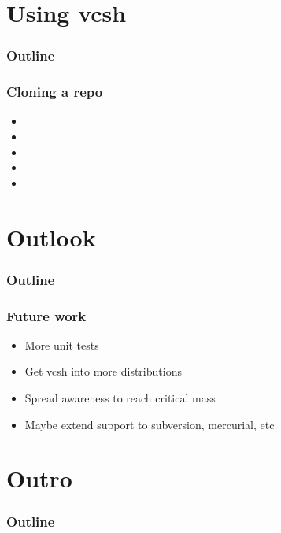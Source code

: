 \documentclass[t]{beamer}
\begin{document}

\section{Using vcsh}

\begin{frame}
	\frametitle{Outline}
	\tableofcontents[currentsection]
\end{frame}

\begin{frame}
	\frametitle{Cloning a repo}
	\begin{itemize}
		\item 
		\item 
		\item 
		\item 
		\item 
	\end{itemize}
\end{frame}




\section{Outlook}

\begin{frame}
	\frametitle{Outline}
	\tableofcontents[currentsection]
\end{frame}

\begin{frame}
	\frametitle{Future work}
	\begin{itemize}
		\item More unit tests
		\item Get vcsh into more distributions
		\item Spread awareness to reach critical mass
		\item Maybe extend support to subversion, mercurial, etc
	\end{itemize}
\end{frame}

\section{Outro}

\begin{frame}
	\frametitle{Outline}
	\tableofcontents[currentsection]
\end{frame}
\end{document}
